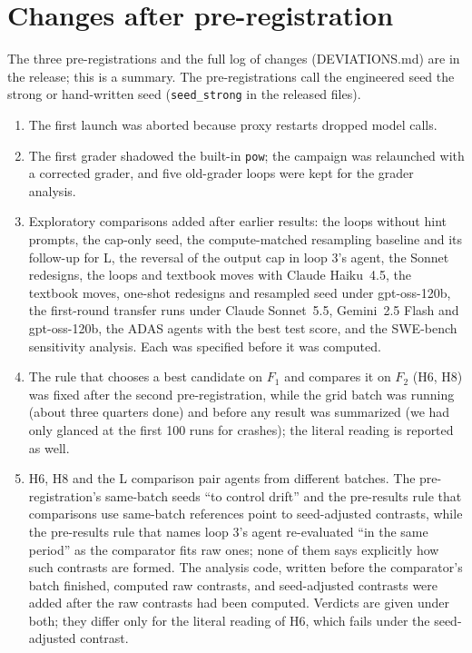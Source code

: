 \section{Changes after pre-registration}\label{app:dev}
The three pre-registrations and the full log of changes (DEVIATIONS.md) are in the release; this is a summary. The
pre-registrations call the engineered seed the strong or hand-written seed (\texttt{seed\_strong} in the released files).
\begin{enumerate}\setlength{\itemsep}{1pt}
\item The first launch was aborted because proxy restarts dropped model calls.
\item The first grader shadowed the built-in \texttt{pow}; the campaign was relaunched with a corrected grader, and five
old-grader loops were kept for the grader analysis.
\item Exploratory comparisons added after earlier results: the loops without hint prompts, the cap-only seed, the
compute-matched resampling baseline and its follow-up for L, the reversal of the output cap in loop 3's agent, the
Sonnet redesigns, the loops
and textbook moves with Claude Haiku~4.5, the textbook moves, one-shot redesigns and resampled seed under gpt-oss-120b,
the first-round transfer runs under Claude Sonnet~5.5, Gemini~2.5 Flash and gpt-oss-120b, the ADAS agents with the best
test score, and the SWE-bench sensitivity analysis. Each was specified before it was computed.
\item The rule that chooses a best candidate on $F_1$ and compares it on $F_2$ (H6, H8) was fixed after the second
pre-registration, while the grid batch was running (about three quarters done) and before any result was summarized
(we had only glanced at the first 100 runs for crashes);
the literal reading is reported as well.
\item H6, H8 and the L comparison pair agents from different batches. The pre-registration's same-batch seeds ``to
control drift'' and the pre-results rule that comparisons use same-batch references point to seed-adjusted contrasts,
while the pre-results rule that names loop 3's agent re-evaluated ``in the same period'' as the comparator fits raw
ones; none of
them says explicitly how such contrasts are formed. The analysis code, written before the comparator's batch finished,
computed raw contrasts, and seed-adjusted contrasts were added after the raw contrasts had been computed. Verdicts are given under both; they differ
only for the literal reading of H6, which fails under the seed-adjusted contrast.

\end{enumerate}
